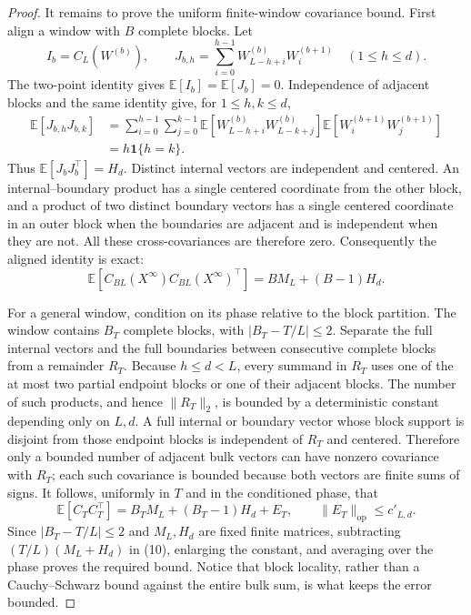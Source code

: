 \documentclass{article}
\begin{document}
\begin{proof}
It remains to prove the uniform finite-window covariance bound.  First align a window with \(B\) complete blocks.  Let
\[
I_b=C_L(W^{(b)}),\qquad
J_{b,h}=\sum_{i=0}^{h-1}W^{(b)}_{L-h+i}W^{(b+1)}_i
\quad(1\le h\le d). \tag{7}
\]
The two-point identity gives \(\mathbb E[I_b]=\mathbb E[J_b]=0\).  Independence of adjacent blocks and the same identity give, for \(1\le h,k\le d\),
\[
\begin{aligned}
\mathbb E[J_{b,h}J_{b,k}]
&=\sum_{i=0}^{h-1}\sum_{j=0}^{k-1}
 \mathbb E[W^{(b)}_{L-h+i}W^{(b)}_{L-k+j}]
 \mathbb E[W^{(b+1)}_iW^{(b+1)}_j]\\
&=h\mathbf 1\{h=k\}. \tag{8}
\end{aligned}
\]
Thus \(\mathbb E[J_bJ_b^{\top}]=H_d\).  Distinct internal vectors are independent and centered.  An internal--boundary product has a single centered coordinate from the other block, and a product of two distinct boundary vectors has a single centered coordinate in an outer block when the boundaries are adjacent and is independent when they are not.  All these cross-covariances are therefore zero.  Consequently the aligned identity is exact:
\[
\mathbb E[C_{BL}(X^{\infty})C_{BL}(X^{\infty})^{\top}]
=BM_L+(B-1)H_d. \tag{9}
\]

For a general window, condition on its phase relative to the block partition.  The window contains \(B_T\) complete blocks, with \(|B_T-T/L|\le2\).  Separate the full internal vectors and the full boundaries between consecutive complete blocks from a remainder \(R_T\).  Because \(h\le d<L\), every summand in \(R_T\) uses one of the at most two partial endpoint blocks or one of their adjacent blocks.  The number of such products, and hence \(\|R_T\|_2\), is bounded by a deterministic constant depending only on \(L,d\).  A full internal or boundary vector whose block support is disjoint from those endpoint blocks is independent of \(R_T\) and centered.  Therefore only a bounded number of adjacent bulk vectors can have nonzero covariance with \(R_T\); each such covariance is bounded because both vectors are finite sums of signs.  It follows, uniformly in \(T\) and in the conditioned phase, that
\[
\mathbb E[C_TC_T^{\top}]
=B_TM_L+(B_T-1)H_d+E_T,
\qquad \|E_T\|_{\mathrm{op}}\le c'_{L,d}. \tag{10}
\]
Since \(|B_T-T/L|\le2\) and \(M_L,H_d\) are fixed finite matrices, subtracting \((T/L)(M_L+H_d)\) in (10), enlarging the constant, and averaging over the phase proves the required bound.  Notice that block locality, rather than a Cauchy--Schwarz bound against the entire bulk sum, is what keeps the error bounded.


\end{proof}
\end{document}
